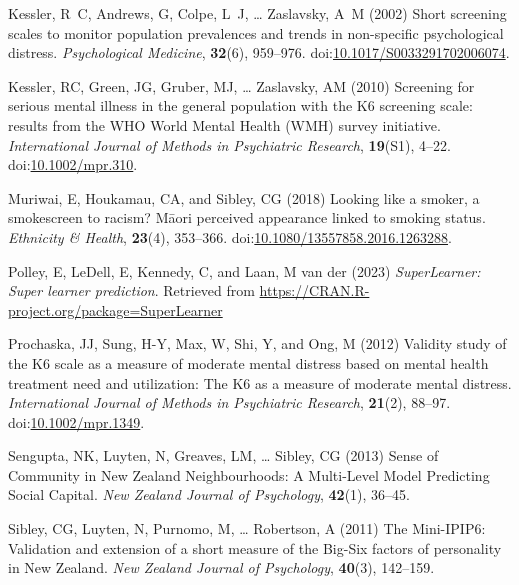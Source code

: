 \documentclass[
  singlecolumn,
  9pt]{article}
\newlength{\cslhangindent}
\newenvironment{CSLReferences}[2] %
 {\begin{list}{}{%
  \setlength{\itemindent}{0pt}
  \setlength{\leftmargin}{0pt}
  \setlength{\parsep}{0pt}
  \ifodd #1
   \setlength{\leftmargin}{\cslhangindent}
   \setlength{\itemindent}{-1\cslhangindent}
  \fi
  \setlength{\itemsep}{#2\baselineskip}}}
 {\end{list}}
\begin{document}
\begin{CSLReferences}{1}{0}
Kessler, R~C, Andrews, G, Colpe, L~J, \ldots{} Zaslavsky, A~M (2002)
Short screening scales to monitor population prevalences and trends in
non-specific psychological distress. \emph{Psychological Medicine},
\textbf{32}(6), 959--976.
doi:\href{https://doi.org/10.1017/S0033291702006074}{10.1017/S0033291702006074}.

Kessler, RC, Green, JG, Gruber, MJ, \ldots{} Zaslavsky, AM (2010)
Screening for serious mental illness in the general population with the
K6 screening scale: results from the WHO World Mental Health (WMH)
survey initiative. \emph{International Journal of Methods in Psychiatric
Research}, \textbf{19}(S1), 4--22.
doi:\href{https://doi.org/10.1002/mpr.310}{10.1002/mpr.310}.

Muriwai, E, Houkamau, CA, and Sibley, CG (2018) Looking like a smoker, a
smokescreen to racism? Māori perceived appearance linked to smoking
status. \emph{Ethnicity \& Health}, \textbf{23}(4), 353--366.
doi:\href{https://doi.org/10.1080/13557858.2016.1263288}{10.1080/13557858.2016.1263288}.

Polley, E, LeDell, E, Kennedy, C, and Laan, M van der (2023)
\emph{SuperLearner: Super learner prediction}. Retrieved from
\url{https://CRAN.R-project.org/package=SuperLearner}

Prochaska, JJ, Sung, H-Y, Max, W, Shi, Y, and Ong, M (2012) Validity
study of the K6 scale as a measure of moderate mental distress based on
mental health treatment need and utilization: The K6 as a measure of
moderate mental distress. \emph{International Journal of Methods in
Psychiatric Research}, \textbf{21}(2), 88--97.
doi:\href{https://doi.org/10.1002/mpr.1349}{10.1002/mpr.1349}.

Sengupta, NK, Luyten, N, Greaves, LM, \ldots{} Sibley, CG (2013) Sense
of Community in New Zealand Neighbourhoods: A Multi-Level Model
Predicting Social Capital. \emph{New Zealand Journal of Psychology},
\textbf{42}(1), 36--45.

Sibley, CG, Luyten, N, Purnomo, M, \ldots{} Robertson, A (2011) The
Mini-IPIP6: Validation and extension of a short measure of the Big-Six
factors of personality in New Zealand. \emph{New Zealand Journal of
Psychology}, \textbf{40}(3), 142--159.


\end{CSLReferences}
\end{document}

